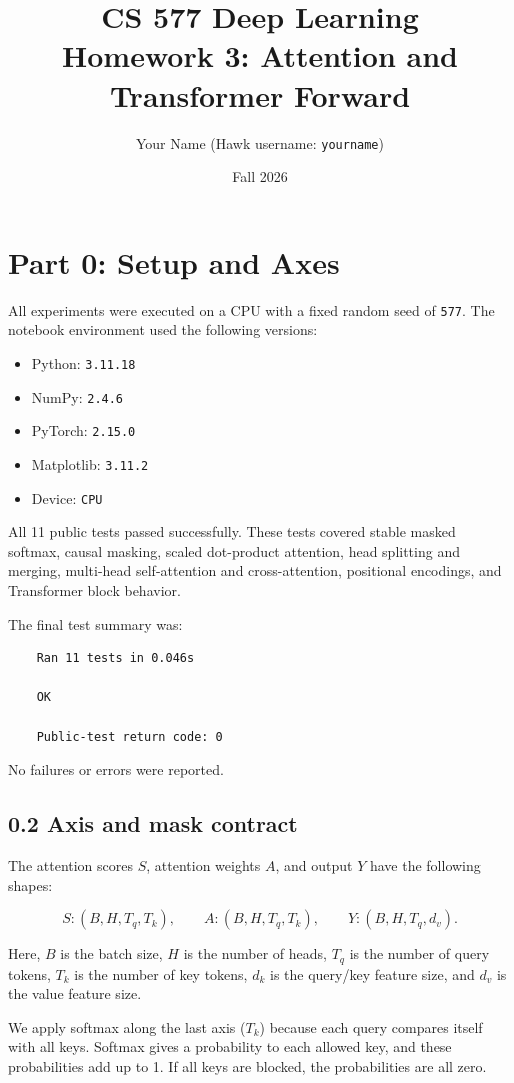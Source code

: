 \documentclass[11pt]{article}
\title{CS 577 Deep Learning\\Homework 3: Attention and Transformer Forward}
\author{Your Name (Hawk username: \texttt{yourname})}
\date{Fall 2026}
\begin{document}
\maketitle
\section*{Part 0: Setup and Axes}
All experiments were executed on a CPU with a fixed random seed of
\texttt{577}. The notebook environment used the following versions:

\begin{itemize}
    \item Python: \texttt{3.11.18}
    \item NumPy: \texttt{2.4.6}
    \item PyTorch: \texttt{2.15.0}
    \item Matplotlib: \texttt{3.11.2}
    \item Device: \texttt{CPU}
\end{itemize}

All 11 public tests passed successfully. These tests covered stable
masked softmax, causal masking, scaled dot-product attention,
head splitting and merging, multi-head self-attention and
cross-attention, positional encodings, and Transformer block behavior.

The final test summary was:

\begin{verbatim}
    Ran 11 tests in 0.046s

    OK

    Public-test return code: 0
\end{verbatim}

No failures or errors were reported.

\subsection*{0.2 Axis and mask contract}
The attention scores $S$, attention weights $A$, and output $Y$
have the following shapes:

\[
S: (B, H, T_q, T_k), \qquad
A: (B, H, T_q, T_k), \qquad
Y: (B, H, T_q, d_v).
\]

Here, $B$ is the batch size, $H$ is the number of heads,
$T_q$ is the number of query tokens, $T_k$ is the number
of key tokens, $d_k$ is the query/key feature size,
and $d_v$ is the value feature size.

We apply softmax along the last axis ($T_k$) because
each query compares itself with all keys. Softmax gives
a probability to each allowed key, and these probabilities
add up to 1. If all keys are blocked, the probabilities
are all zero.
\end{document}
